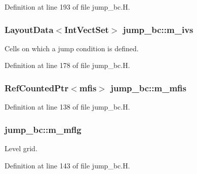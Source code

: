 Definition at line 193 of file jump\+\_\+bc.\+H.

\subsubsection[{\texorpdfstring{m\+\_\+ivs}{m_ivs}}]{\setlength{\rightskip}{0pt plus 5cm}Layout\+Data$<$Int\+Vect\+Set$>$ jump\+\_\+bc\+::m\+\_\+ivs\hspace{0.3cm}{\ttfamily [protected]}}\hypertarget{classjump__bc_a87161f121c3aed92573d1d668e34bf37}{}\label{classjump__bc_a87161f121c3aed92573d1d668e34bf37}


Cells on which a jump condition is defined. 



Definition at line 178 of file jump\+\_\+bc.\+H.

\subsubsection[{\texorpdfstring{m\+\_\+mfis}{m_mfis}}]{\setlength{\rightskip}{0pt plus 5cm}Ref\+Counted\+Ptr$<${\bf mfis}$>$ jump\+\_\+bc\+::m\+\_\+mfis\hspace{0.3cm}{\ttfamily [protected]}}\hypertarget{classjump__bc_a892bf0092729ac5ae0b04a9c61f36bac}{}\label{classjump__bc_a892bf0092729ac5ae0b04a9c61f36bac}


Definition at line 138 of file jump\+\_\+bc.\+H.

\subsubsection[{\texorpdfstring{m\+\_\+mflg}{m_mflg}}]{ jump\+\_\+bc\+::m\+\_\+mflg\hspace{0.3cm}{\ttfamily [protected]}}\hypertarget{classjump__bc_a961e7bfeab1734c6efcbf3342921c3e7}{}\label{classjump__bc_a961e7bfeab1734c6efcbf3342921c3e7}


Level grid. 



Definition at line 143 of file jump\+\_\+bc.\+H.


